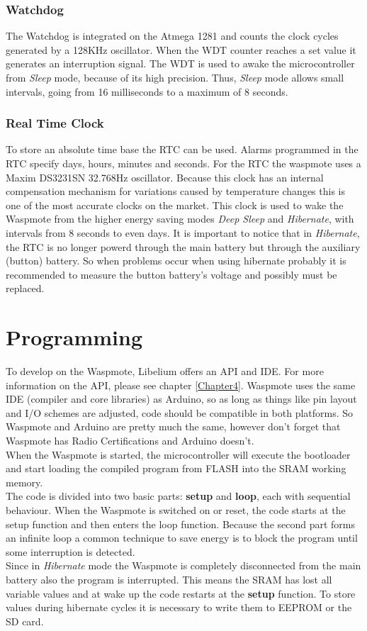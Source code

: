 \subsubsection{Watchdog}
The Watchdog is integrated on the Atmega 1281 and counts the clock cycles generated by a 128KHz oscillator. When the WDT counter reaches a set value it generates an interruption signal. The WDT is used to awake the microcontroller from \textit{Sleep} mode, because of its high precision. Thus, \textit{Sleep} mode allows small intervals, going from 16 milliseconds to a maximum of 8 seconds.
\subsubsection{Real Time Clock}
To store an absolute time base the RTC can be used. Alarms programmed in the RTC specify days, hours, minutes and seconds. For the RTC the waspmote uses a Maxim DS3231SN 32.768Hz oscillator. Because this clock has an internal compensation mechanism for variations caused by temperature changes this is one of the most accurate clocks on the market. This clock is used to wake the Waspmote from the higher energy saving modes \textit{Deep Sleep} and \textit{Hibernate}, with intervals from 8 seconds to even days. It is important to notice that in \textit{Hibernate}, the RTC is no longer powerd through the main battery but through the auxiliary (button) battery. So when problems occur when using hibernate probably it is recommended to measure the button battery's voltage and possibly must be replaced.
\section{Programming}
To develop on the Waspmote, Libelium offers an API and IDE. For more information on the API, please see chapter \ref{Chapter4}. Waspmote uses the same IDE (compiler and core libraries) as Arduino, so as long as things like pin layout and I/O schemes are adjusted, code should be compatible in both platforms. So Waspmote and Arduino are pretty much the same, however don't forget that Waspmote has Radio Certifications and Arduino doesn't.\\  
When the Waspmote is started, the microcontroller will execute the bootloader and start loading the compiled program from FLASH into the SRAM working memory.\\
The code is divided into two basic parts: \textbf{setup} and \textbf{loop}, each with sequential behaviour. When the Waspmote is switched on or reset, the code starts at the setup function and then enters the loop function. Because the second part forms an infinite loop a common technique to save energy is to block the program until some interruption is detected.\\
Since in \textit{Hibernate} mode the Waspmote is completely disconnected from the main battery also the program is interrupted. This means the SRAM has lost all variable values and at wake up the code restarts at the \textbf{setup} function. To store values during hibernate cycles it is necessary to write them to EEPROM or the SD card.
